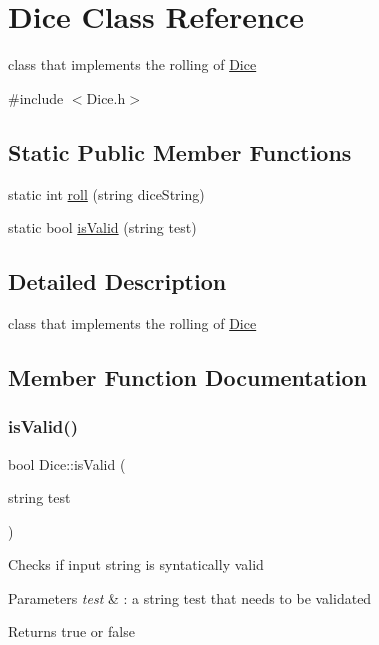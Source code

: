 \hypertarget{class_dice}{}\section{Dice Class Reference}
\label{class_dice}


class that implements the rolling of \hyperlink{class_dice}{Dice}  




{\ttfamily \#include $<$Dice.\+h$>$}

\subsection*{Static Public Member Functions}
\begin{DoxyCompactItemize}
\item 
static int \hyperlink{class_dice_a9d062543cd55b9ccad4649f80a970e10}{roll} (string dice\+String)
\item 
static bool \hyperlink{class_dice_add8db0b3ba7cd229a3b3cea3ee87fcad}{is\+Valid} (string test)
\end{DoxyCompactItemize}


\subsection{Detailed Description}
class that implements the rolling of \hyperlink{class_dice}{Dice} 

\subsection{Member Function Documentation}
\hypertarget{class_dice_add8db0b3ba7cd229a3b3cea3ee87fcad}{}\label{class_dice_add8db0b3ba7cd229a3b3cea3ee87fcad} 
\subsubsection{\texorpdfstring{is\+Valid()}{isValid()}}
{\footnotesize\ttfamily bool Dice\+::is\+Valid (\begin{DoxyParamCaption}\item[{string}]{test }\end{DoxyParamCaption})\hspace{0.3cm}{\ttfamily [static]}}

Checks if input string is syntatically valid 
\begin{DoxyParams}{Parameters}
{\em test} & \+: a string test that needs to be validated \\
\hline
\end{DoxyParams}
\begin{DoxyReturn}{Returns}
true or false 
\end{DoxyReturn}
\hypertarget{class_dice_a9d062543cd55b9ccad4649f80a970e10}{}\label{class_dice_a9d062543cd55b9ccad4649f80a970e10} 
